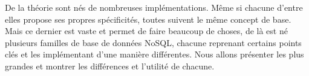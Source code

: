 De la théorie sont nés de nombreuses implémentations. Même si chacune d'entre elles propose ses propres spécificités, toutes suivent le même concept de base. Mais ce dernier est vaste et permet de faire beaucoup de choses, de là est né plusieurs familles de base de données NoSQL, chacune reprenant certains points clés et les implémentant d'une manière différentes. Nous allons présenter les plus grandes et montrer les différences et l'utilité de chacune. 
